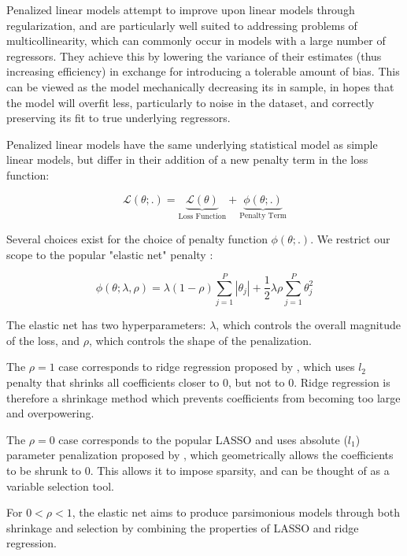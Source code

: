 \documentclass[a4paper, table]{article}
\begin{document}
Penalized linear models attempt to improve upon linear models through regularization, and are particularly well suited to addressing problems of multicollinearity, which can commonly occur in models with a large number of regressors. They achieve this by lowering the variance of their estimates (thus increasing efficiency) in exchange for introducing a tolerable amount of bias. This can be viewed as the model mechanically decreasing its in sample, in hopes that the model will overfit less, particularly to noise in the dataset, and correctly preserving its fit to true underlying regressors.

Penalized linear models have the same underlying statistical model as simple linear models, but differ in their addition of a new penalty term in the loss function:

\begin{equation}
	\mathcal{L(\theta;.)} = 
	\underset{\text{Loss Function}}{\underbrace{\mathcal{L(\theta)}}} + 
	\underset{\text{Penalty Term}}{\underbrace{\phi(\theta;.)}}
\end{equation}

Several choices exist for the choice of penalty function \( \phi(\theta;.) \). We restrict our scope to the popular "elastic net" penalty \citep{zou_regularization_2005}:

\begin{equation}
	\phi(\theta;\lambda,\rho) = 
	\lambda(1-\rho) \sum_{j = 1}^{P}|\theta_j| +
	\frac{1}{2} \lambda \rho \sum_{j = 1}^{P}\theta_j^2
\end{equation}

The elastic net has two hyperparameters: $\lambda$, which controls the overall magnitude of the loss, and $\rho$, which controls the shape of the penalization. 

The $\rho = 1$ case corresponds to ridge regression proposed by \cite{hoerl_ridge_1970}, which uses $l_2$ penalty that shrinks all coefficients closer to 0, but not to 0. Ridge regression is therefore a shrinkage method which prevents coefficients from becoming too large and overpowering. 

The $\rho = 0$ case corresponds to the popular LASSO and uses absolute ($l_1$) parameter penalization proposed by \cite{tibshirani_regression_1996}, which geometrically allows the coefficients to be shrunk to 0. This allows it to impose sparsity, and can be thought of as a variable selection tool.

For \(0 < \rho < 1\), the elastic net aims to produce parsimonious models through both shrinkage and selection by combining the properties of LASSO and ridge regression.
\end{document}
